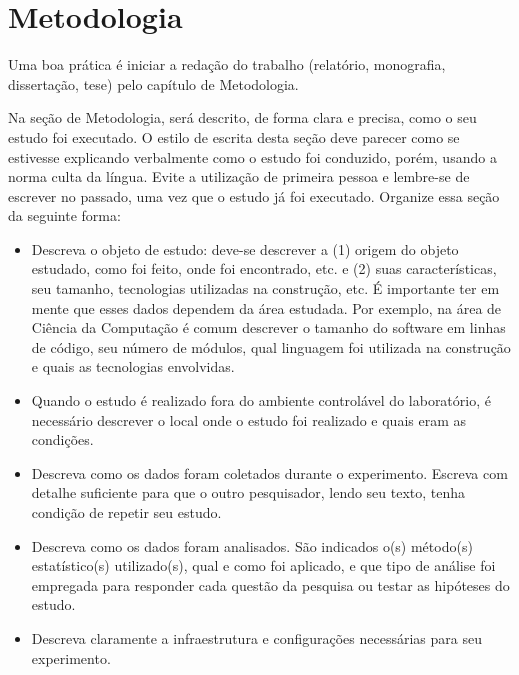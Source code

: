 \chapter{Metodologia}
\label{ch:metodologia}

Uma boa prática é iniciar a redação do trabalho (relatório, monografia, dissertação, tese) pelo capítulo de Metodologia.

Na seção de Metodologia, será descrito, de forma clara e precisa, como o seu estudo foi executado. O estilo de escrita desta seção deve parecer como se estivesse explicando verbalmente como o estudo foi conduzido, porém, usando a norma culta da língua. Evite a utilização de primeira pessoa e lembre-se de escrever no passado, uma vez que o estudo já foi executado. Organize essa seção da seguinte forma:

    \begin{itemize}
        \item Descreva o objeto de estudo: deve-se descrever a (1) origem do objeto estudado, como foi feito, onde foi encontrado, etc. e (2) suas características, seu tamanho, tecnologias utilizadas na construção, etc. É importante ter em mente que esses dados dependem da área estudada. Por exemplo, na área de Ciência da Computação é comum descrever o tamanho do software em linhas de código, seu número de módulos, qual linguagem foi utilizada na construção e quais as tecnologias envolvidas.
        \item Quando o estudo é realizado fora do ambiente controlável do laboratório, é necessário descrever o local onde o estudo foi realizado e quais eram as condições.
        \item Descreva como os dados foram coletados durante o experimento. Escreva com detalhe suficiente para que o outro pesquisador, lendo seu texto, tenha condição de repetir seu estudo.
        \item Descreva como os dados foram analisados. São indicados o(s) método(s) estatístico(s) utilizado(s), qual e como foi aplicado, e que tipo de análise foi empregada para responder cada questão da pesquisa ou testar as hipóteses do estudo.
        \item Descreva claramente a infraestrutura e configurações necessárias para seu experimento.
    \end{itemize}
    
